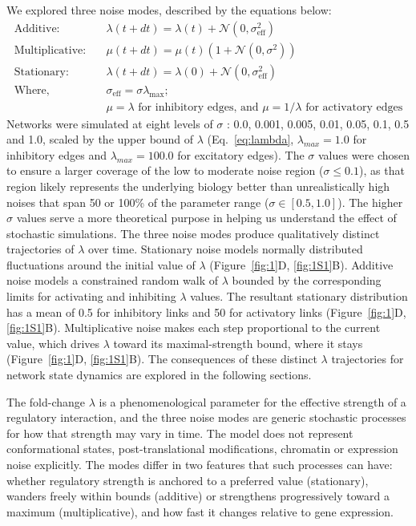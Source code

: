 \documentclass[11pt]{article}
\begin{document}
We explored three noise modes, described by the equations below: 
\begin{equation}
\begin{aligned}
\text{Additive:} \quad & \lambda(t+dt) = \lambda(t) + \mathcal{N}(0, \sigma_{\text{eff}}^2) \\
\text{Multiplicative:} \quad & \mu(t+dt) = \mu(t)\left(1 + \mathcal{N}(0, \sigma^2)\right) \\
\text{Stationary:} \quad & \lambda(t+dt) = \lambda(0) + \mathcal{N}(0, \sigma_{\text{eff}}^2) \\
\text{Where,} \quad & \sigma_{\text{eff}} = \sigma\lambda_{\text{max}}\text{;} \\
& \mu = \lambda \text{ for inhibitory edges, and } \mu = 1/\lambda \text{ for activatory edges}
\end{aligned}
\label{eq:lambda}
\end{equation}
Networks were simulated at eight levels of $\sigma$ : 0.0, 0.001, 0.005, 0.01, 0.05, 0.1, 0.5 and 1.0, scaled by the upper bound of $\lambda$ (Eq.~\ref{eq:lambda}, $\lambda_{max} = 1.0$ for inhibitory edges and $\lambda_{max} = 100.0$ for excitatory edges). The $\sigma$ values were chosen to ensure a larger coverage of the low to moderate noise region ($\sigma \leq 0.1$), as that region likely represents the underlying biology better than unrealistically high noises that span 50 or 100\% of the parameter range ($\sigma \in [0.5, 1.0]$). The higher $\sigma$ values serve a more theoretical purpose in helping us understand the effect of stochastic simulations. The three noise modes produce qualitatively distinct trajectories of $\lambda$ over time. Stationary noise models normally distributed fluctuations around the initial value of $\lambda$ (Figure~\ref{fig:1}D, \ref{fig:1S1}B). Additive noise models a constrained random walk of $\lambda$ bounded by the corresponding limits for activating and inhibiting $\lambda$ values. The resultant stationary distribution has a mean of 0.5 for inhibitory links and 50 for activatory links (Figure~\ref{fig:1}D, \ref{fig:1S1}B). Multiplicative noise makes each step proportional to the current value, which drives $\lambda$ toward its maximal-strength bound, where it stays (Figure~\ref{fig:1}D, \ref{fig:1S1}B). The consequences of these distinct $\lambda$ trajectories for network state dynamics are explored in the following sections.

The fold-change $\lambda$ is a phenomenological parameter for the effective strength of a regulatory interaction, and the three noise modes are generic stochastic processes for how that strength may vary in time. The model does not represent conformational states, post-translational modifications, chromatin or expression noise explicitly. The modes differ in two features that such processes can have: whether regulatory strength is anchored to a preferred value (stationary), wanders freely within bounds (additive) or strengthens progressively toward a maximum (multiplicative), and how fast it changes relative to gene expression.
\end{document}
